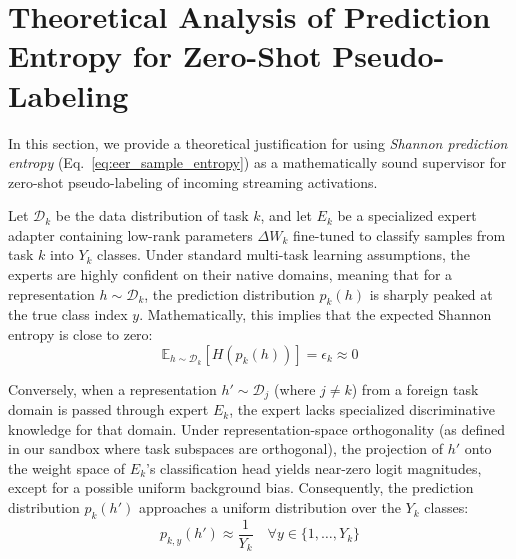 \documentclass{article}
\theoremstyle{plain}
\theoremstyle{definition}
\theoremstyle{remark}
\begin{document}










\newpage
\appendix
\onecolumn
\section{Theoretical Analysis of Prediction Entropy for Zero-Shot Pseudo-Labeling}
\label{app:theory}

In this section, we provide a theoretical justification for using \emph{Shannon prediction entropy} (Eq.~\ref{eq:eer_sample_entropy}) as a mathematically sound supervisor for zero-shot pseudo-labeling of incoming streaming activations.

Let $\mathcal{D}_k$ be the data distribution of task $k$, and let $E_k$ be a specialized expert adapter containing low-rank parameters $\Delta W_k$ fine-tuned to classify samples from task $k$ into $Y_k$ classes. Under standard multi-task learning assumptions, the experts are highly confident on their native domains, meaning that for a representation $h \sim \mathcal{D}_k$, the prediction distribution $p_k(h)$ is sharply peaked at the true class index $y$. Mathematically, this implies that the expected Shannon entropy is close to zero:
\begin{equation}
\mathbb{E}_{h \sim \mathcal{D}_k}[H(p_k(h))] = \epsilon_k \approx 0
\end{equation}

Conversely, when a representation $h' \sim \mathcal{D}_j$ (where $j \neq k$) from a foreign task domain is passed through expert $E_k$, the expert lacks specialized discriminative knowledge for that domain. Under representation-space orthogonality (as defined in our sandbox where task subspaces are orthogonal), the projection of $h'$ onto the weight space of $E_k$'s classification head yields near-zero logit magnitudes, except for a possible uniform background bias. Consequently, the prediction distribution $p_k(h')$ approaches a uniform distribution over the $Y_k$ classes:
\begin{equation}
p_{k, y}(h') \approx \frac{1}{Y_k} \quad \forall y \in \{1, \dots, Y_k\}
\end{equation}
\end{document}
